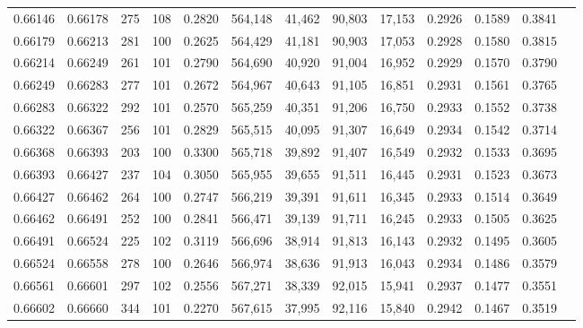 \begin{tabular}{rrrrrrrrrrrrr}
0.66146 & 0.66178 &   275 & 108 &                                     0.2820 & 564,148 &  41,462 &  90,803 &  17,153 & 0.2926 & 0.1589 & 0.3841 \\
0.66179 & 0.66213 &   281 & 100 &                                     0.2625 & 564,429 &  41,181 &  90,903 &  17,053 & 0.2928 & 0.1580 & 0.3815 \\
0.66214 & 0.66249 &   261 & 101 &                                     0.2790 & 564,690 &  40,920 &  91,004 &  16,952 & 0.2929 & 0.1570 & 0.3790 \\
0.66249 & 0.66283 &   277 & 101 &                                     0.2672 & 564,967 &  40,643 &  91,105 &  16,851 & 0.2931 & 0.1561 & 0.3765 \\
0.66283 & 0.66322 &   292 & 101 &                                     0.2570 & 565,259 &  40,351 &  91,206 &  16,750 & 0.2933 & 0.1552 & 0.3738 \\
0.66322 & 0.66367 &   256 & 101 &                                     0.2829 & 565,515 &  40,095 &  91,307 &  16,649 & 0.2934 & 0.1542 & 0.3714 \\
0.66368 & 0.66393 &   203 & 100 &                                     0.3300 & 565,718 &  39,892 &  91,407 &  16,549 & 0.2932 & 0.1533 & 0.3695 \\
0.66393 & 0.66427 &   237 & 104 &                                     0.3050 & 565,955 &  39,655 &  91,511 &  16,445 & 0.2931 & 0.1523 & 0.3673 \\
0.66427 & 0.66462 &   264 & 100 &                                     0.2747 & 566,219 &  39,391 &  91,611 &  16,345 & 0.2933 & 0.1514 & 0.3649 \\
0.66462 & 0.66491 &   252 & 100 &                                     0.2841 & 566,471 &  39,139 &  91,711 &  16,245 & 0.2933 & 0.1505 & 0.3625 \\
0.66491 & 0.66524 &   225 & 102 &                                     0.3119 & 566,696 &  38,914 &  91,813 &  16,143 & 0.2932 & 0.1495 & 0.3605 \\
0.66524 & 0.66558 &   278 & 100 &                                     0.2646 & 566,974 &  38,636 &  91,913 &  16,043 & 0.2934 & 0.1486 & 0.3579 \\
0.66561 & 0.66601 &   297 & 102 &                                     0.2556 & 567,271 &  38,339 &  92,015 &  15,941 & 0.2937 & 0.1477 & 0.3551 \\
0.66602 & 0.66660 &   344 & 101 &                                     0.2270 & 567,615 &  37,995 &  92,116 &  15,840 & 0.2942 & 0.1467 & 0.3519 \\

\end{tabular}
